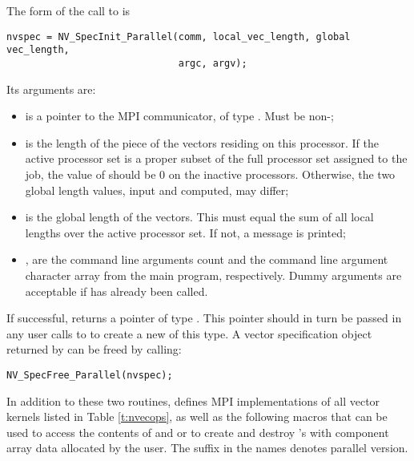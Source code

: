 \noindent The form of the call to  is
\begin{verbatim}
nvspec = NV_SpecInit_Parallel(comm, local_vec_length, global vec_length,
                              argc, argv);
\end{verbatim}
Its arguments are:
\begin{itemize}
\item {} is a pointer to the MPI communicator, of type .
  Must be non-;
\item {} is the length of the piece of the vectors
  residing on this processor. If the active processor set is a proper
  subset of the full processor set assigned to the job, the value of 
  should be 0 on the inactive processors. Otherwise, the two global length values,
  input and computed, may differ;
\item {} is the global length of the vectors.
  This must equal the sum of all local lengths over the active processor set.
  If not, a message is printed;
\item {},  are the command line arguments count
  and the command line argument character array from the main program,
  respectively. Dummy arguments are acceptable if  has
  already been called.
\end{itemize}
If successful,  returns a pointer of type
. This pointer should in turn be passed in any user
calls to  to create a new  of this type.
A vector specification object  returned by 
can be freed by calling:
\begin{verbatim}
NV_SpecFree_Parallel(nvspec);
\end{verbatim}
In addition to these two routines, {\nvecp} defines MPI implementations of all 
vector kernels listed in Table \ref{t:nvecops}, as well as the following macros
that can be used to access the contents of  and 
or to create and destroy 's with component array data allocated
by the user. The suffix  in the names denotes parallel version.

